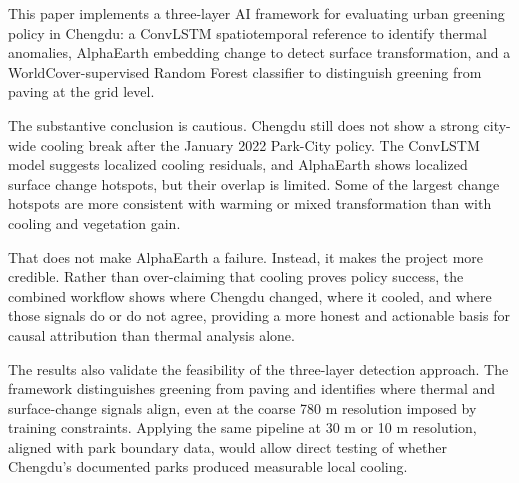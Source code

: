 \documentclass{article}
\begin{document}
This paper implements a three-layer AI framework for evaluating urban greening
policy in Chengdu: a ConvLSTM spatiotemporal reference to identify thermal
anomalies, AlphaEarth embedding change to detect surface transformation, and a
WorldCover-supervised Random Forest classifier to distinguish greening from
paving at the grid level.

The substantive conclusion is cautious. Chengdu still does not show a strong
city-wide cooling break after the January 2022 Park-City policy. The ConvLSTM
model suggests localized cooling residuals, and AlphaEarth shows localized
surface change hotspots, but their overlap is limited. Some of the largest
change hotspots are more consistent with warming or mixed transformation than
with cooling and vegetation gain.

That does not make AlphaEarth a failure. Instead, it makes the project more
credible. Rather than over-claiming that cooling proves policy success, the combined
workflow shows where Chengdu changed, where it cooled, and where those signals
do or do not agree, providing a more honest and actionable basis for causal
attribution than thermal analysis alone.

The results also validate the feasibility of the three-layer detection approach.
The framework distinguishes greening from paving and identifies where thermal
and surface-change signals align, even at the coarse 780 m resolution imposed
by training constraints. Applying the same pipeline at 30 m or 10 m resolution,
aligned with park boundary data, would allow direct testing of whether
Chengdu's documented parks produced measurable local cooling.

\FloatBarrier
\end{document}
